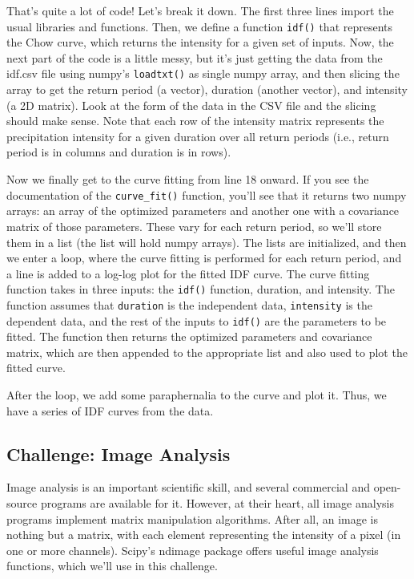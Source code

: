 \documentclass[12pt]{article}
\newcommand{\code}{\texttt}
\begin{document}
That's quite a lot of code! Let's break it down. The first three lines import the usual libraries and functions. Then, we define a function \code{idf()} that represents the Chow curve, which returns the intensity for a given set of inputs. Now, the next part of the code is a little messy, but it's just getting the data from the idf.csv file using numpy's \code{loadtxt()} as single numpy array, and then slicing the array to get the return period (a vector), duration (another vector), and intensity (a 2D matrix). Look at the form of the data in the CSV file and the slicing should make sense. Note that each row of the intensity matrix represents the precipitation intensity for a given duration over all return periods (i.e., return period is in columns and duration is in rows).

Now we finally get to the curve fitting from line 18 onward. If you see the documentation of the \code{curve\_fit()} function, you'll see that it returns two numpy arrays: an array of the optimized parameters and another one with a covariance matrix of those parameters. These vary for each return period, so we'll store them in a list (the list will hold numpy arrays). The lists are initialized, and then we enter a loop, where the curve fitting is performed for each return period, and a line is added to a log-log plot for the fitted IDF curve. The curve fitting function takes in three inputs: the \code{idf()} function, duration, and intensity. The function assumes that \code{duration} is the independent data, \code{intensity} is the dependent data, and the rest of the inputs to \code{idf()} are the parameters to be fitted. The function then returns the optimized parameters and covariance matrix, which are then appended to the appropriate list and also used to plot the fitted curve.

After the loop, we add some paraphernalia to the curve and plot it. Thus, we have a series of IDF curves from the data. 

\subsection{Challenge: Image Analysis}
Image analysis is an important scientific skill, and several commercial and open-source programs are available for it. However, at their heart, all image analysis programs implement matrix manipulation algorithms. After all, an image is nothing but a matrix, with each element representing the intensity of a pixel (in one or more channels). Scipy's ndimage package offers useful image analysis functions, which we'll use in this challenge. 
\end{document}
